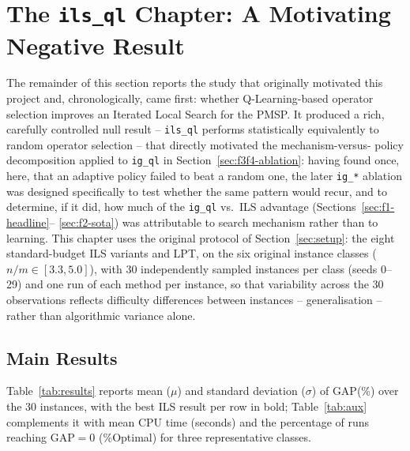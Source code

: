 \documentclass[final,3p,times,11pt,authoryear]{elsarticle}
\begin{document}
\section{The \texttt{ils\_ql} Chapter: A Motivating Negative Result}
\label{sec:ils-chapter}

The remainder of this section reports the study that originally
motivated this project and, chronologically, came first: whether
Q-Learning-based operator selection improves an Iterated Local Search
for the PMSP. It produced a rich, carefully controlled null result --
\texttt{ils\_ql} performs statistically equivalently to random
operator selection -- that directly motivated the mechanism-versus-%
policy decomposition applied to \texttt{ig\_ql} in
Section~\ref{sec:f3f4-ablation}: having found once, here, that an
adaptive policy failed to beat a random one, the later
\texttt{ig\_*} ablation was designed specifically to test whether the same pattern
would recur, and to determine, if it did, how much of the
\texttt{ig\_ql} vs.\ ILS advantage (Sections~\ref{sec:f1-headline}--%
\ref{sec:f2-sota}) was attributable to search mechanism rather than
to learning. This chapter uses the original protocol of
Section~\ref{sec:setup}: the eight standard-budget ILS variants and
LPT, on the six original instance classes ($n/m \in [3.3, 5.0]$), with
30 independently sampled instances per class (seeds 0--29) and one
run of each method per instance, so that variability across the 30
observations reflects difficulty differences between instances --
generalisation -- rather than algorithmic variance alone.

\subsection{Main Results}
\label{sec:ils-results}

Table~\ref{tab:results} reports mean ($\mu$) and standard deviation
($\sigma$) of GAP(\%) over the 30 instances, with the best ILS result
per row in bold; Table~\ref{tab:aux} complements it with mean CPU time
(seconds) and the percentage of runs reaching $\mathrm{GAP}=0$
(\%Optimal) for three representative classes.
\end{document}
